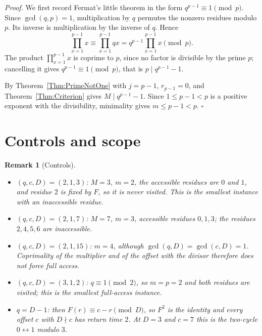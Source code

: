 \documentclass[11pt,letterpaper]{article}
\newtheorem{remark}[theorem]{Remark}
\newenvironment{proof}{\noindent\textit{Proof.}}{\hfill\(\square\)}
\begin{document}
\begin{proof}
We first record Fermat's little theorem in the form
\(q^{p-1}\equiv1\pmod p\). Since \(\gcd(q,p)=1\), multiplication by
\(q\) permutes the nonzero residues modulo \(p\).
Its inverse is multiplication by the inverse of \(q\). Hence
\[
\prod_{x=1}^{p-1}x\equiv\prod_{x=1}^{p-1}qx=q^{p-1}\prod_{x=1}^{p-1}x
\pmod p .
\]
The product \(\prod_{x=1}^{p-1}x\) is coprime to \(p\), since no factor is
divisible by the prime \(p\); cancelling it gives \(q^{p-1}\equiv1\pmod p\),
that is \(p\mid q^{p-1}-1\).

By Theorem~\ref{Thm:PrimeNotOne} with \(j=p-1\), \(r_{p-1}=0\), and
Theorem~\ref{Thm:Criterion} gives \(M\mid q^{p-1}-1\). Since
\(1\le p-1<p\) is a positive exponent with the divisibility, minimality
gives \(m\le p-1<p\).
\end{proof}

\section{Controls and scope}

\begin{remark}[Controls]\label{Rem:Controls}
\begin{itemize}[leftmargin=2em]
\item \((q,c,D)=(2,1,3)\): \(M=3\), \(m=2\), the accessible residues are
\(0\) and \(1\), and residue \(2\) is fixed by \(F\), so it is never
visited. This is the smallest instance with an inaccessible residue.
\item \((q,c,D)=(2,1,7)\): \(M=7\), \(m=3\), accessible residues \(0,1,3\);
the residues \(2,4,5,6\) are inaccessible.
\item \((q,c,D)=(2,1,15)\): \(m=4\), although \(\gcd(q,D)=\gcd(c,D)=1\).
Coprimality of the multiplier and of the offset with the divisor therefore
does not force full access.
\item \((q,c,D)=(3,1,2)\): \(q\equiv1\pmod 2\), so \(m=p=2\) and both
residues are visited; this is the smallest full-access instance.
\item \(q=D-1\): then \(F(r)\equiv c-r\pmod D\), so \(F^2\) is the identity
and every offset \(c\) with \(D\nmid c\) has return time \(2\). At \(D=3\)
and \(c=7\) this is the two-cycle \(0\leftrightarrow1\) modulo \(3\).
\end{itemize}
\end{remark}
\end{document}
